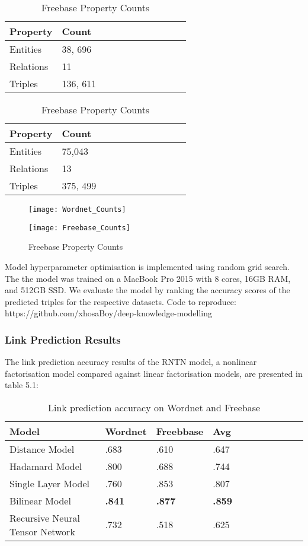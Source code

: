 \begin{table}[H]
	\parbox{.5\linewidth}{
		\caption{Wordnet Property Counts}
		\centering
		\begin{tabular}{lllllllllll}
  			\textbf{Property} & \textbf{Count}  \\
  			\hline
  			Entities & 38, 696  \\
  			Relations & 11  \\
  			Triples & 136, 611  \\
		\end{tabular}
		}
	\hfill
	\parbox{.5\linewidth}{
		\caption{Freebase Property Counts}
		\centering
		\begin{tabular}{lllllllllll}
  			\textbf{Property} & \textbf{Count}  \\
  			\hline
  			Entities & 75,043   \\
  			Relations & 13  \\
  			Triples & 375, 499  \\
		\end{tabular}
		}
\end{table}

\begin{figure}[H]
	\parbox{.5\linewidth}{
   		\caption{Wordnet Property Counts}
   		\centering
    		\texttt{[image: Wordnet\_Counts]}
		}
	\hfill
	\parbox{.5\linewidth}{
	\caption{Freebase Property Counts}
   		\centering
    		\texttt{[image: Freebase\_Counts]}
		}
\end{figure}

Model hyperparameter optimisation is implemented using random grid search. The the model was trained on a MacBook Pro 2015 with 8 cores, 16GB RAM, and 512GB SSD. \newline
We evaluate the model by ranking the accuracy scores of the predicted triples for the respective datasets. Code to reproduce: https://github.com/xhosaBoy/deep-knowledge-modelling

\subsubsection{Link Prediction Results}
The link prediction accuracy results of the RNTN model, a nonlinear factorisation model compared against linear factorisation models, are presented in table 5.1:

\begin{table}[H]
\caption{Link prediction accuracy on Wordnet and Freebase}
\centering
\begin{tabular}{lllllllllll}
  \textbf{Model} & \textbf{Wordnet} & \textbf{Freebbase} & \textbf{Avg} \\
  \hline
  Distance Model & .683 & .610 & .647 \\
  Hadamard Model & .800 & .688 & .744 \\
  Single Layer Model & .760 & .853 & .807 \\
  Bilinear Model & \textbf{.841} & \textbf{.877} & \textbf{.859} \\
  Recursive Neural Tensor Network & .732 & .518 & .625 \\

\end{tabular}
\end{table}

